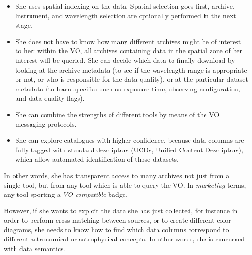 		\begin{itemize}
			\item She uses spatial indexing on the data. Spatial
			selection goes first, archive, instrument, and
			wavelength selection are optionally performed in the
			next stage.
			
			 \item She does not have to know how many different
			archives might be of interest to her: within the VO,
			all archives containing data in the spatial zone of her
			interest will be queried. She can decide which data to
			finally download by looking at the archive metadata (to
			see if the wavelength range is appropriate or not, or
			who is responsible for the data quality), or at the
			particular dataset metadata (to learn specifics such as
			exposure time, observing configuration, and data
			quality flags).
			
			 \item She can combine the strengths of different tools
			by means of the VO messaging protocols.
			
			 \item She can explore catalogues with higher
			confidence, because data columns are fully tagged with
			standard descriptors (UCDs, Unified Content
			Descriptors), which allow automated identification of
			those datasets.
		\end{itemize}
		
		In other words, she has transparent access to many archives
		not just from a single tool, but from any tool which is
		able to query the VO. In \emph{marketing} terms, any tool
		sporting a \emph{VO-compatible} badge.
		
		 However, if she wants to exploit the data she has just
		collected, for instance in order to perform cross-matching
		between sources, or to create different color diagrams, she
		needs to know how to find which data columns correspond to
		different astronomical or astrophysical concepts. In other
		words, she is concerned with data semantics.
		


